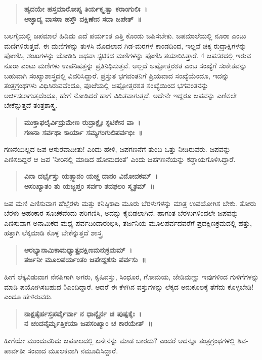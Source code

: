 \begin{verse}
\textbf{ಹೃದಯೇ ಹಸ್ತಮಾರೋಪ್ಯ ತಿರ್ಯಕ್ಕೃತ್ವಾ ಕರಾಂಗುಲಿಃ~। \\
ಆಚ್ಛಾದ್ಯ ವಾಸಸಾ ಹಸ್ತೌ ದಕ್ಷಿಣೇನ ಸದಾ ಜಪೇತ್~॥}
\end{verse}
ಬಲಗೈಯಲ್ಲಿ ಜಪಮಾಲೆ ಹಿಡಿದು ಎದೆ ಪರ್ಯಂತ ಎತ್ತಿ ಕೊಂಡು ಜಪಿಸಬೇಕು. ಜಪಮಾಲೆಯಲ್ಲಿ ನೂರಾ ಎಂಟು ಮಣಿಗಳಿರುತ್ತವೆ. ಈ ಮಣಿಗಳನ್ನು ತುಳಸಿ ಮೊದಲಾದ ಗಿಡ-ಮರಗಳ ಕಾಂಡದಿಂದ, ಇಲ್ಲವೆ ಚಿಕ್ಕ ರುದ್ರಾಕ್ಷಿಗಳನ್ನು ಪೋಣಿಸಿ, ಶಂಖಗಳನ್ನು ಜೋಡಿಸಿ ಅಥವಾ ಸ್ಫಟಿಕದ ಮಣಿಗಳನ್ನು ಪೊಣಿಸಿ ತಯಾರಿಸಿತ್ತಾರೆ. 4 ಜಪಸರದಲ್ಲಿ ಇರುವ ನೂರಾ ಎಂಟು ಮಣಿಗಳು ಉಪನಿಷತ್ತನ್ನು ಪ್ರತಿನಿಧಿಸುತ್ತವೆ. ಅಲ್ಲದೆ ಅಷ್ಟೋತ್ತರಶತ ಎಂಬ ಸಂಖ್ಯೆಗೆ ಸಂಕೇತವನ್ನು ಬಹುವಾಗಿ ಸಂಖ್ಯಾಶಾಸ್ತ್ರದಲ್ಲಿ ವಿವರಿಸಿದ್ದಾರೆ. ಪ್ರಸ್ತುತ ಭಗವಂತನಿಗೆ ಪ್ರಿಯವಾದ ಸಂಖ್ಯೆಯೆಂದೂ, ಇದನ್ನು ತಂತ್ರಗ್ರಂಥಗಳು ವಿಧಿಸಿರುವವೆಂದೂ, ಪೂಜೆಯಲ್ಲಿ ಅಷ್ಟೋತ್ತರಶತ ಸಂಖ್ಯೆಯಿಂದ ಭಗವಂತನನ್ನು ಅರ್ಚಿಸಲಾಗುತ್ತದೆಂದೂ, ಹೇಗೆ ನೋಡಿದರೆ ಹಾಗೆ ವಿದಿತವಾಗುತ್ತದೆ. ಅದೇನೇ ಇದ್ದರೂ ಜಪವನ್ನು ಎಣಿಸಲೇ ಬೇಕೆನ್ನುತ್ತದೆ ತಂತ್ರಶಾಸ್ತ್ರ.
\begin{verse}
\textbf{ಮುಕ್ತಾಫಲೈರ್ವಿದ್ರುಮೇಣ ರುದ್ರಾಕ್ಷೈಃ ಸ್ಫಟಿಕೇನ ವಾ~। \\
ಗಣನಾ ಸರ್ವಥಾ ಕಾರ್ಯಾ ಸಮ್ಯಗಂಗುಲಿಪರ್ವಭಿಃ~॥}
\end{verse}
ಗಣನೆಯಿಲ್ಲದ ಜಪ ಆಸುರವಾದೀತು! ಎಂದು ಹೇಳಿ, ಜಪಗಣನೆಗೆ ತುಂಬ ಒತ್ತು ನೀಡಿರುವರು. ಜಪವನ್ನು ಎಣಿಸದಿದ್ದರೆ ಆ ಜಪ ’ನೀರಿನಲ್ಲಿ ಮಾಡಿದ ಹೋಮದಂತೆ’ ಎಂದು ಜಪಗಣನೆಯನ್ನು ಕಡ್ಡಾಯಗೊಳಿಸಿದ್ದಾರೆ.
\begin{verse}
\textbf{ವಿನಾ ದರ್ಭೈಸ್ತು ಯತ್ಸ್ನಾನಂ ಯಚ್ಚ ದಾನಂ ವಿನೋದಕಮ್~। \\
ಅಸಂಖ್ಯಾತಂ ತು ಯಜ್ಜಪ್ತಂ ಸರ್ವಂ ತದಫಲಂ ಸ್ಮೃತಮ್~॥}
\end{verse}
ಜಪ ಮಣಿ ಎಣಿಸುವಾಗ ಹೆಬ್ಬೆರಳು ಮತ್ತು ಕನಿಷ್ಠಿಕಾದಿ ಮೂರು ಬೆರಳುಗಳನ್ನು ಮಾತ್ರ ಉಪಯೋಗಿಸ ಬೇಕು. ತೋರು ಬೆರಳು ಅಹಂಕಾರ ಸೂಚಕವೆಂದು ಪರಿಗಣಿಸಿ, ಅದನ್ನು ಕೈಬಿಡಲಾಗಿದೆ. ಹಾಗಂತ ಬೆರಳುಗಳಿಂದಲೇ ಜಪವನ್ನು ಎಣಿಸುವಾಗ ಅನಾಮಿಕದ ಮಧ್ಯ ಪರ್ವದಿಂದಾರಂಭಿಸಿ, ತರ್ಜನಿಯ ಮೂಲಪರ್ವದವರೆಗೆ ಪ್ರದಕ್ಷಿಣಕ್ರಮದಲ್ಲಿ ಹತ್ತು, ಹತ್ತಾಗಿ ಲೆಕ್ಕಮಾಡಿ ಕೊಳ್ಳ ಬೇಕೆನ್ನುತ್ತದೆ ಶಾಸ್ತ್ರ.
\begin{verse}
\textbf{ಆರಭ್ಯಾನಾಮಿಕಾಮಧ್ಯಾತ್ಪ್ರದಕ್ಷಿಣಮನುಕ್ರಮಮ್~। \\
ತರ್ಜನೀ ಮೂಲಪರ್ಯಂತಂ ಜಪೇದ್ದಶಸು ಪರ್ವಸು~॥}
\end{verse}
ಹೀಗೆ ಲೆಕ್ಕವಿಡುವಾಗ ನೆನಪಿಗಾಗಿ ಅಗರು, ಕೃಷಿವಸ್ತು, ಸಿಂಧೂರ, ಗೋಮಯ, ಜೇಡಿಮಣ್ಣು ಇವುಗಳಿಂದ ಗುಳಿಗೆಗಳನ್ನು ಮಾಡಿ ಪಯೋಗಿಸಬಹುದ 5ಎಂದಿದ್ದಾರೆ. ಆದರೆ ಈ ಕೆಳಗಿನ ವಸ್ತುಗಳನ್ನು ಲೆಕ್ಕದ ಅನುಕೂಲಕ್ಕೆ ತೆಗೆದು ಕೊಳ್ಳಬೇಡಿ! ಎಂದೂ ಹೇಳಿರುವರು.
\begin{verse}
\textbf{ನಾಕ್ಷತೈರ್ಹಸ್ತಪರ್ವೈರ್ವಾ ನ ಧಾನ್ಯೈರ್ನ ಚ ಪುಷ್ಪಕೈಃ~। \\
ನ ಚಂದನೈರ್ಮೃತ್ತಿಕಯಾ ಜಪಸಂಖ್ಯಾಂ ಚ ಕಾರಯೇತ್~॥}
\end{verse}
ಹೀಗೆಯೇ ಮುಂದುವರಿದು ಜಪಕಾಲದಲ್ಲಿ ಏನೇನನ್ನು ಮಾಡ ಬಾರದು? ಎಂದರೆ ಅದನ್ನೂ ತಂತ್ರಗ್ರಂಥಗಳಲ್ಲಿ ಶಿವ-ಪಾರ್ವತೀ ಸಂವಾದ ಮೂಲಕವಾಗಿ ನಮೂದಿಸಿದ್ದಾರೆ.
